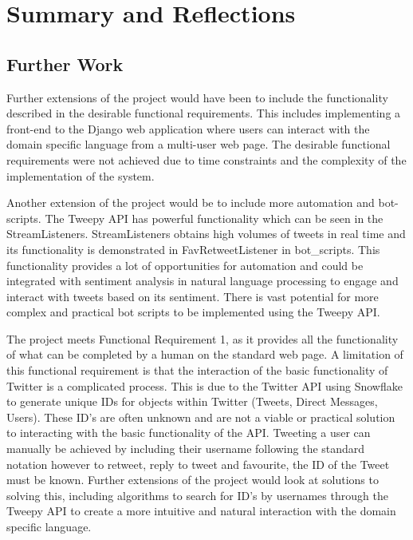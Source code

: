 \chapter{Summary and Reflections}

\section{Further Work}

Further extensions of the project would have been to include the functionality described in the desirable functional requirements. This includes implementing a front-end to the Django web application where users can interact with the domain specific language from a multi-user web page. The desirable functional requirements were not achieved due to time constraints and the complexity of the implementation of the system. \newline \par

Another extension of the project would be to include more automation and bot-scripts. The Tweepy API has powerful functionality which can be seen in the StreamListeners. StreamListeners obtains high volumes of tweets in real time and its functionality is demonstrated in FavRetweetListener in bot\_scripts. This functionality provides a lot of opportunities for automation and could be integrated with sentiment analysis in natural language processing to engage and interact with tweets based on its sentiment. There is vast potential for more complex and practical bot scripts to be implemented using the Tweepy API. \newline \par
 
The project meets Functional Requirement 1, as it provides all the functionality of what can be completed by a human on the standard web page. A limitation of this functional requirement is that the interaction of the basic functionality of Twitter is a complicated process. This is due to the Twitter API using Snowflake to generate unique IDs for objects within Twitter (Tweets, Direct Messages, Users). These ID's are often unknown and are not a viable or practical solution to interacting with the basic functionality of the API. Tweeting a user can manually be achieved by including their username following the standard \@ notation however to retweet, reply to tweet and favourite, the ID of the Tweet must be known. Further extensions of the project would look at solutions to solving this, including algorithms to search for ID's by usernames through the Tweepy API to create a more intuitive and natural interaction with the domain specific language.

